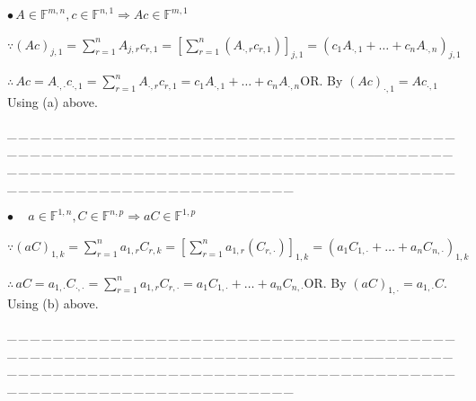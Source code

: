 \documentclass[a4paper, 11pt, UTF8]{article}
\def\Fbb{{\mathbb{F}}}
\def\BulletPoint{{\small$\bullet$}}
\def\Or{\large O{\footnotesize R.} }
\def\ProblemEnding{{\tiny \_\,\_\,\_\,\_\,\_\,\_\,\_\,\_\,\_\,\_\,\_\,\_\,\_\,\_\,\_\,\_\,\_\,\_\,\_\,\_\,\_\,\_\,\_\,\_\,\_\,\_\,\_\,\_\,\_\,\_\,\_\,\_\,\_\,\_\,\_\,\_\,\_\,\_\,\_\,\_\,\_\,\_\,\_\,\_\,\_\,\_\,\_\,\_\,\_\,\_\,\_\,\_\,\_\,\_\,\_\,\_\,\_\,\_\,\_\,\_\,\_\,\_\,\_\,\_\,\_\,\_\,\_\,\_\,\_\,\_\,\_\_\,\_\,\_\,\_\,\_\,\_\,\_\,\_\,\_\,\_\,\_\,\_\,\_\,\_\,\_\,\_\,\_\,\_\,\_\,\_\,\_\,\_\,\_\,\_\,\_\,\_\,\_\,\_\,\_\,\_\,\_\,\_\,\_\,\_\,\_\,\_\,\_\,\_\,\_\,\_\,\_\,\_\,\_\,\_\,\_\,\_\,\_\,\_\,\_\,\_\,\_\,\_\,\_\,\_\,\_\,\_\,\_\,\_\,\_\,\_\,\_\,\_\,\_\,\_\,\_\,\_\,\_\,\_\,\_\,\_\,\_}}
\begin{document}
\begin{large}
\BulletPoint \,\NoteForSmall{[3.52]}\quad $A\in\Fbb^{m,n},c\in\Fbb^{n,1}\Rightarrow Ac\in\Fbb^{m,1}$\par\quad
$\because(Ac)_{j,1}=\sum\limits_{r=1}^n A_{j,r}c_{r,1}=[\sum\limits_{r=1}^n(A_{\cdot,r}c_{r,1})]_{j,1}=(c_1 A_{\cdot,1}+\dots+c_n A_{\cdot,n})_{j,1}$\par\quad
$\therefore\,Ac=A_{\cdot,\cdot}c_{\cdot,1}=\sum\limits_{r=1}^n A_{\cdot,r}c_{r,1}=c_1 A_{\cdot,1}+\dots+c_n A_{\cdot,n}$\quad \Or By $(Ac)_{\cdot,1}=Ac_{\cdot,1}$ Using (a) above.\par
\ProblemEnding\par
\BulletPoint \,\qquad\,\,\,\, $a\in\Fbb^{1,n},C\in\Fbb^{n,p}\Rightarrow aC\in\Fbb^{1,p}$\par\quad
$\because(aC)_{1,k}=\sum\limits_{r=1}^n a_{1,r}C_{r,k}=[\sum\limits_{r=1}^n a_{1,r}(C_{r,\cdot})]_{1,k}=(a_1 C_{1,\cdot}+\dots+a_n C_{n,\cdot})_{1,k}$\par\quad
$\therefore\,aC=a_{1,\cdot}C_{\cdot,\cdot}=\sum\limits_{r=1}^n a_{1,r}C_{r,\cdot}=a_1 C_{1,\cdot}+\dots+a_n C_{n,\cdot}$\quad \Or By $(aC)_{1,\cdot}=a_{1,\cdot}C$. Using (b) above.
\vspace{-4pt}\par
\ProblemEnding\par


\end{large}
\end{document}
